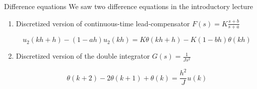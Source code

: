 \documentclass[presentation,aspectratio=1610]{beamer}
\begin{document}
\begin{frame}[label={sec:orgdfb76e8}]{Difference equations}
We saw two difference equations in the introductory lecture

\begin{enumerate}
\item Discretized version of continuous-time lead-compensator \(F(s)=K\frac{s+b}{s+a}\)
\begin{center}
\end{center}
\[ u_2(kh+h) - (1-ah)u_2(kh) = K\theta(kh+h) - K(1-bh)\theta(kh) \]
\item Discretized version of the double integrator \(G(s)=\frac{1}{Js^2}\)
\begin{center}
\end{center}
\[ \theta(k+2) - 2\theta(k+1) + \theta(k) = \frac{h^2}{J} u(k)\]
\end{enumerate}
\end{frame}
\end{document}
